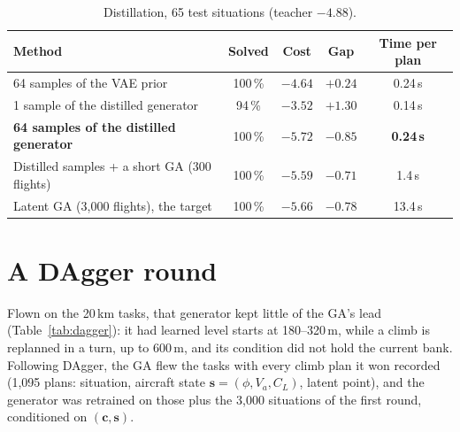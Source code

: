 \documentclass[11pt,a4paper,oneside]{report}
\newcommand{\vect}[1]{\boldsymbol{#1}}
\newcommand{\CL}{C_L}
\begin{document}
\begin{table}[ht]\centering\small
\caption{Distillation, 65 test situations (teacher $-4.88$).}\label{tab:distill}
\begin{tabular}{@{}lcccc@{}}
\toprule
Method & Solved & Cost & Gap & Time per plan \\ \midrule
64 samples of the VAE prior & 100\,\% & $-4.64$ & $+0.24$ & 0.24\,s \\
1 sample of the distilled generator & 94\,\% & $-3.52$ & $+1.30$ & 0.14\,s \\
\textbf{64 samples of the distilled generator} & 100\,\% & $\mathbf{-5.72}$ & $\mathbf{-0.85}$ & \textbf{0.24\,s} \\
Distilled samples + a short GA (300 flights) & 100\,\% & $-5.59$ & $-0.71$ & 1.4\,s \\
Latent GA (3{,}000 flights), the target & 100\,\% & $-5.66$ & $-0.78$ & 13.4\,s \\
\bottomrule
\end{tabular}
\end{table}

\section{A DAgger round}
Flown on the 20\,km tasks, that generator kept little of the GA's lead (Table~\ref{tab:dagger}): it had learned level starts at 180--320\,m, while a climb is replanned in a turn, up to 600\,m, and its condition did not hold the current bank. Following DAgger, the GA flew the tasks with every climb plan it won recorded (1{,}095 plans: situation, aircraft state $\vect s = (\phi, V_a, \CL)$, latent point), and the generator was retrained on those plus the 3{,}000 situations of the first round, conditioned on $(\vect c, \vect s)$.

\begin{table}[ht]\centering\small
\caption{64 tasks of 20\,km, MacCready 0.5 / 1.}\label{tab:dagger}
\end{table}
\end{document}
